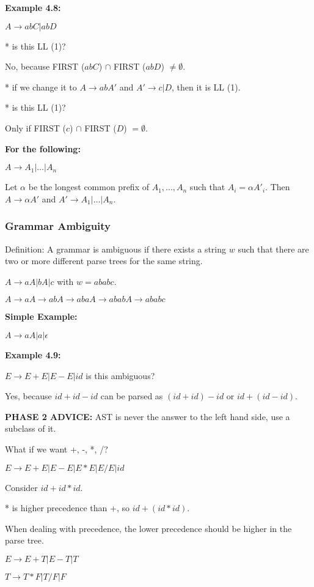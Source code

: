 \documentclass[twocolumn]{article}
\begin{document}
\textbf{Example 4.8:}

$A \to abC | abD$

* is this LL (1)?

No, because FIRST ($abC$) $\cap$ FIRST ($abD$) $\neq \emptyset$.

* if we change it to $A \to abA'$ and $A' \to c | D$, then it is LL (1).

* is this LL (1)?

Only if FIRST ($c$) $\cap$ FIRST ($D$) $= \emptyset$.

\textbf{For the following:}

$A \to A _1 | \dots | A _n$

Let $\alpha$ be the longest common prefix of $A _1, \dots, A _n$ such that $A _i = \alpha A' _i$.
Then $A \to \alpha A'$ and $A' \to A _1 | \dots | A _n$.

\subsubsection{Grammar Ambiguity}

Definition: A grammar is ambiguous if there exists a string $w$ such that there are two or more different parse trees for the same string.

$A \to aA | bA | c$ with $w = ababc$.

$A \to aA \to abA \to abaA \to ababA \to ababc$

\textbf{Simple Example:}

$A \to aA | a | \mathcal{\epsilon}$

\textbf{Example 4.9:}

$E \to E + E | E - E | id$ is this ambiguous?

Yes, because $id + id - id$ can be parsed as $(id + id) - id$ or $id + (id - id)$.

\newpage

\textbf{PHASE 2 ADVICE:} AST is never the answer to the left hand side, use a subclass of it.

What if we want +, -, *, /?

$E \to E + E | E - E | E * E | E / E | id$

Consider $id + id * id$.

* is higher precedence than +, so $id + (id * id)$.

When dealing with precedence, the lower precedence should be higher in the parse tree.

$E \to E + T | E - T | T$

$T \to T * F | T / F | F$
\end{document}
